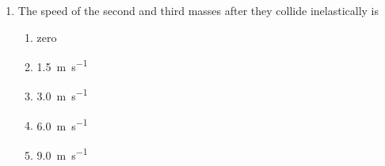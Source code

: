 \documentclass{../../../oss-classkick}
\begin{document}
\begin{multicols}{2}
\begin{enumerate}[leftmargin=18pt,resume]
  \item The speed of the second and third masses after they collide
    inelastically is
    \label{3masses2}
    \begin{enumerate}[nosep,leftmargin=18pt,label=(\Alph*)]
    \item zero
    \item\SI{1.5}{\metre\per\second}
    \item\SI{3.0}{\metre\per\second}
    \item\SI{6.0}{\metre\per\second}
    \item\SI{9.0}{\metre\per\second}
    \end{enumerate}
  \end{enumerate}
  

    

\end{multicols}
\end{document}
